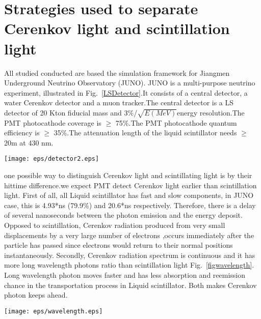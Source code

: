 \documentclass[a4paper,10pt]{cpc-hepnp}
\begin{document}
\section{Strategies used to separate Cerenkov light and scintillation light}
All studied conducted are based the simulation framework for  Jiangmen
Underground Neutrino Observatory (JUNO). JUNO is a multi-purpose
neutrino experiment, illustrated in Fig.~\ref{LSDetector}.It consists of a central detector, a water Cerenkov detector and a
muon tracker.The central detector is a LS detector of 20 Kton fiducial mass and
3\%/$\sqrt{E(MeV)}$energy resolution.The PMT photocathode coverage is $\ge$ 75\%.The PMT photocathode quantum efficiency is
$\ge$ 35\%.The attenuation length of the liquid scintillator needs $\ge$ 20m at 430 nm.
\begin{center}
\texttt{[image: eps/detector2.eps]}
\end{center}
one possible way to distinguish Cerenkov light and scintillating light is by their hittime
difference\cite{lab2}.we expect PMT detect Cerenkov light earlier than scintillation light.
First of all, all Liquid scintillator has fast and slow components, in JUNO case, this is 4.93*ns (79.9\%) and 20.6*ns respectively.
Therefore, there is a delay of several nanoseconds between the photon emission and the energy deposit.
Opposed to scintillation, Cerenkov radiation produced from very small displacements by a very large number of electrons
,occurs immediately after the particle has passed since electrons would return to their normal positions
 instantaneously\cite{special_article}.
 Secondly, Cerenkov radiation spectrum is continuous and it has more long wavelength
photons ratio than scintillation light Fig.~\ref{figwavelength}. Long wavelength photon moves faster and has less absorption
 and reemission chance in the transportation process in Liquid scintillator. Both makes Cerenkov photon keeps ahead.
\begin{center}
\texttt{[image: eps/wavelength.eps]}
\end{center}
\end{document}
